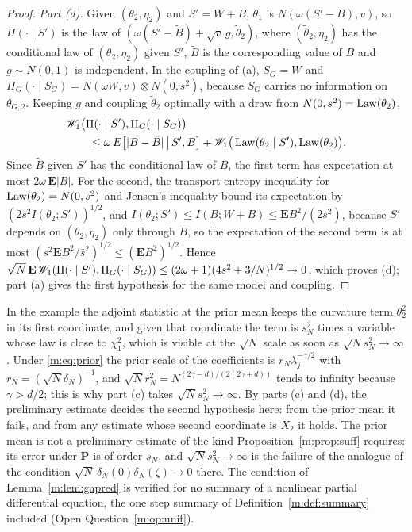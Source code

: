 \begin{proof}
\emph{Part (d).} Given $(\theta_2,\eta_2)$ and $S'=W+B$, $\theta_1$ is $N(\omega(S'-B),v)$, so $\Pi(\cdot\mid S')$ is the law of $(\omega(S'-\tilde B)+\sqrt v\,g,\tilde\theta_2)$, where $(\tilde\theta_2,\tilde\eta_2)$ has the conditional law of $(\theta_2,\eta_2)$ given $S'$, $\tilde B$ is the corresponding value of $B$ and $g\sim N(0,1)$ is independent. In the coupling of (a), $S_G=W$ and $\Pi_G(\cdot\mid S_G)=N(\omega W,v)\otimes N(0,s^2)$, because $S_G$ carries no information on $\theta_{G,2}$. Keeping $g$ and coupling $\tilde\theta_2$ optimally with a draw from $N(0,s^2)=\operatorname{Law}(\theta_2)$,
\[
\begin{aligned}
&\mathscr{W}_1\big(\Pi(\cdot\mid S'),\Pi_G(\cdot\mid S_G)\big)\\
&\qquad\le\omega\,E\big[|B-\tilde B|\,\big|\,S',B\big]+\mathscr{W}_1\big(\operatorname{Law}(\theta_2\mid S'),\operatorname{Law}(\theta_2)\big).
\end{aligned}
\]
Since $\tilde B$ given $S'$ has the conditional law of $B$, the first term has expectation at most $2\omega\,\mathbf E|B|$. For the second, the transport entropy inequality for $\operatorname{Law}(\theta_2)=N(0,s^2)$ and Jensen's inequality bound its expectation by $(2s^2I(\theta_2;S'))^{1/2}$, and $I(\theta_2;S')\le I(B;W+B)\le\mathbf EB^2/(2\bar s^2)$, because $S'$ depends on $(\theta_2,\eta_2)$ only through $B$, so the expectation of the second term is at most $(s^2\mathbf EB^2/\bar s^2)^{1/2}\le(\mathbf EB^2)^{1/2}$. Hence $\sqrt N\,\mathbf E\,\mathscr{W}_1(\Pi(\cdot\mid S'),\Pi_G(\cdot\mid S_G))\le(2\omega+1)(4s^2+3/N)^{1/2}\to0$, which proves (d); part (a) gives the first hypothesis for the same model and coupling.
\end{proof}

In the example the adjoint statistic at the prior mean keeps the curvature term $\theta_2^2$ in its first coordinate, and given that coordinate the term is $s_N^2$ times a variable whose law is close to $\chi^2_1$, which is visible at the $\sqrt N$ scale as soon as $\sqrt Ns_N^2\to\infty$. Under \eqref{m:eq:prior} the prior scale of the coefficients is $r_N\lambda_j^{-\gamma/2}$ with $r_N=(\sqrt N\delta_N)^{-1}$, and $\sqrt Nr_N^2=N^{(2\gamma-d)/(2(2\gamma+d))}$ tends to infinity because $\gamma>d/2$; this is why part (c) takes $\sqrt Ns_N^2\to\infty$. By parts (c) and (d), the preliminary estimate decides the second hypothesis here: from the prior mean it fails, and from any estimate whose second coordinate is $X_2$ it holds. The prior mean is not a preliminary estimate of the kind Proposition~\ref{m:prop:suff} requires: its error under $\mathbf P$ is of order $s_N$, and $\sqrt Ns_N^2\to\infty$ is the failure of the analogue of the condition $\sqrt N\,\tilde\delta_N(0)\tilde\delta_N(\zeta)\to0$ there. The condition of Lemma~\ref{m:lem:gapred} is verified for no summary of a nonlinear partial differential equation, the one step summary of Definition~\ref{m:def:summary} included (Open Question~\ref{m:op:unif}).

